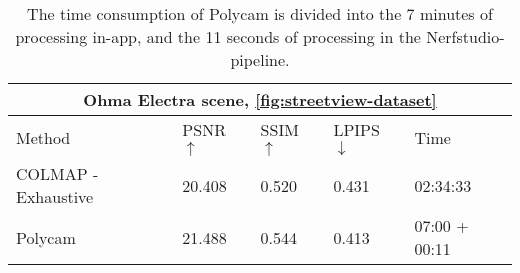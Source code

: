 \begin{table}[h]
\centering
\begin{tabular}{|l|llll|}
\hline
\multicolumn{5}{|c|}{\textbf{Ohma Electra scene, \autoref{fig:streetview-dataset}}} \\
\hline
Method  & PSNR $\uparrow$ & SSIM $\uparrow$ & LPIPS $\downarrow$& Time  \\ \hline
COLMAP - Exhaustive         & 20.408    & 0.520    &  0.431     & 02:34:33     \\
Polycam                     & 21.488    & 0.544    & 0.413      & 07:00 + 00:11 \\
\hline
\end{tabular}
\caption{The time consumption of Polycam is divided into the 7 minutes of processing in-app, and the 11 seconds of processing in the Nerfstudio-pipeline. %
}
\label{tab:colmap-polycam-comparison}
\end{table}